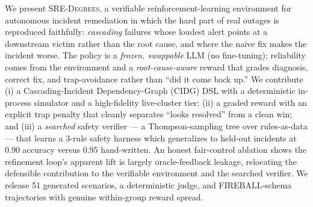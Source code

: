 We present \textsc{SRE-Degrees}, a verifiable reinforcement-learning environment for
autonomous incident remediation in which the hard part of real outages is reproduced
faithfully: \emph{cascading} failures whose loudest alert points at a downstream victim
rather than the root cause, and where the naive fix makes the incident worse. The policy is
a \emph{frozen, swappable} LLM (no fine-tuning); reliability comes from the environment and a
\emph{root-cause-aware} reward that grades diagnosis, correct fix, and trap-avoidance rather
than ``did it come back up.'' We contribute (i) a Cascading-Incident Dependency-Graph (CIDG)
DSL with a deterministic in-process simulator and a high-fidelity live-cluster tier;
(ii) a graded reward with an explicit trap penalty that cleanly separates ``looks resolved''
from a clean win; and (iii) a \emph{searched} safety verifier --- a Thompson-sampling tree
over rules-as-data --- that learns a 3-rule safety harness which generalizes to held-out
incidents at 0.90 accuracy versus 0.95 hand-written. An honest fair-control ablation shows
the refinement loop's apparent lift is largely oracle-feedback leakage, relocating the
defensible contribution to the verifiable environment and the searched verifier. We release
51 generated scenarios, a deterministic judge, and FIREBALL-schema trajectories with genuine
within-group reward spread.
